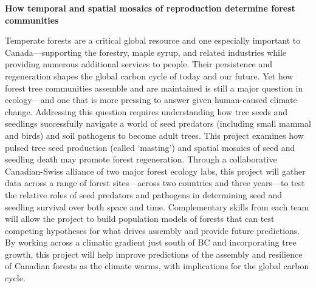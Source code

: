 \documentclass[12pt,oneside]{article}
\begin{document}


\thispagestyle{empty}
\begin{center}
{\bf How temporal and spatial mosaics of reproduction determine forest communities} 
\vspace{-1ex}
\end{center}

Temperate forests are a critical global resource and one especially important to Canada---supporting the forestry, maple syrup, and related industries while providing numerous additional services to people. Their persistence and regeneration shapes the global carbon cycle of today and our future. Yet how forest tree communities assemble and are maintained is still a major question in ecology---and one that is more pressing to answer given human-caused climate change. Addressing this question requires understanding how tree seeds and seedlings successfully navigate a world of seed predators (including small mammal and birds) and soil pathogens to become adult trees. This project examines how pulsed tree seed production (called `masting') and spatial mosaics of seed and seedling death may promote forest regeneration. Through a collaborative Canadian-Swiss alliance of two major forest ecology labs, this project will gather data across a range of forest sites---across two countries and three years---to test the relative roles of seed predators and pathogens in determining seed and seedling survival over both space and time. Complementary skills from each team will allow the project to build population models of forests that can test competing hypotheses for what drives assembly and provide future predictions. By working across a climatic gradient just south of BC and incorporating tree growth, this project will help improve predictions of the assembly and resilience of Canadian forests as the climate warms, with implications for the global carbon cycle. 
\end{document}

